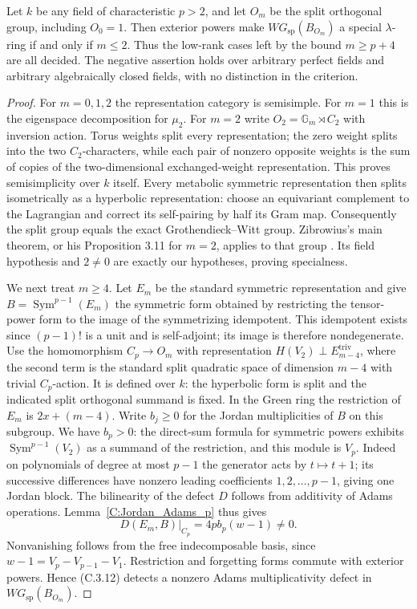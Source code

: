 \begin{theorem}
\label{C:BO_field_lambda}
Let $k$ be any field of characteristic $p>2$, and let $O_m$ be the split
orthogonal group, including $O_0=1$. Then exterior powers make
$WG_{\mathrm{sp}}(B_{O_m})$ a special $\lambda$-ring if and only if
$m\leq2$. Thus the low-rank cases left by the bound $m\geq p+4$ are
all decided. The negative assertion holds over arbitrary perfect fields
and arbitrary algebraically closed fields, with no distinction in the
criterion.
\end{theorem}
\begin{proof}
For $m=0,1,2$ the representation category is semisimple. For $m=1$ this
is the eigenspace decomposition for $\mu_2$. For $m=2$ write
$O_2=\mathbb G_m\rtimes C_2$ with inversion action. Torus weights
split every representation; the zero weight splits into the two
$C_2$-characters, while each pair of nonzero opposite weights is the
sum of copies of the two-dimensional exchanged-weight representation.
This proves semisimplicity over $k$ itself. Every metabolic symmetric
representation then splits isometrically as a hyperbolic representation:
choose an equivariant complement to the Lagrangian and correct its
self-pairing by half its Gram map. Consequently the split group equals
the exact Grothendieck--Witt group. Zibrowius's main theorem, or his
Proposition 3.11 for $m=2$, applies to that group
\cite{C-Zibrowius2015}. Its field hypothesis and $2\ne0$ are exactly
our hypotheses, proving specialness.

We next treat $m\geq4$. Let $E_m$ be the standard symmetric
representation and give $B=\operatorname{Sym}^{p-1}(E_m)$ the symmetric
form obtained by restricting the tensor-power form to the image of the
symmetrizing idempotent. This idempotent exists since $(p-1)!$ is a
unit and is self-adjoint; its image is therefore nondegenerate.
Use the homomorphism $C_p\to O_m$ with representation
$H(V_2)\perp E_{m-4}^{\mathrm{triv}}$, where the second term is the
standard split quadratic space of dimension $m-4$ with trivial
$C_p$-action. It is defined over $k$: the hyperbolic form is split and
the indicated split orthogonal summand is fixed.
In the Green ring the restriction of $E_m$ is $2x+(m-4)$.
Write $b_j\geq0$ for the Jordan multiplicities of $B$ on this subgroup.
We have $b_p>0$: the direct-sum formula for symmetric powers exhibits
$\operatorname{Sym}^{p-1}(V_2)$ as a summand of the restriction, and
this module is $V_p$. Indeed on polynomials of degree at most $p-1$
the generator acts by $t\mapsto t+1$; its successive differences have
nonzero leading coefficients $1,2,\ldots,p-1$, giving one Jordan block.
The bilinearity of the defect $D$ follows from additivity of Adams
operations. Lemma~\ref{C:Jordan_Adams_p} thus gives
\[
 D(E_m,B)\big|_{C_p}=4p b_p(w-1)\ne0.                  \tag{C.3.12}
\]
Nonvanishing follows from the free indecomposable basis, since
$w-1=V_p-V_{p-1}-V_1$. Restriction and forgetting forms commute with
exterior powers. Hence (C.3.12) detects a nonzero Adams
multiplicativity defect in $WG_{\mathrm{sp}}(B_{O_m})$.


\end{proof}
